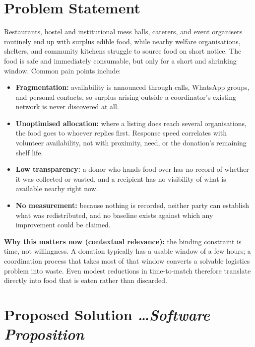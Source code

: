 \documentclass[11pt,a4paper]{article}
\newcommand{\BvrHint}[1]{%
  {\normalfont\normalsize\itshape\hfill #1}}
\begin{document}
\section{Problem Statement}
Restaurants, hostel and institutional mess halls, caterers, and event
organisers routinely end up with surplus edible food, while nearby
welfare organisations, shelters, and community kitchens struggle to
source food on short notice. The food is safe and immediately
consumable, but only for a short and shrinking window. Common pain
points include:
\begin{itemize}[leftmargin=0.7cm]
    \item \textbf{Fragmentation:} availability is announced through calls, WhatsApp groups, and personal contacts, so surplus arising outside a coordinator's existing network is never discovered at all.
    \item \textbf{Unoptimised allocation:} where a listing does reach several organisations, the food goes to whoever replies first. Response speed correlates with volunteer availability, not with proximity, need, or the donation's remaining shelf life.
    \item \textbf{Low transparency:} a donor who hands food over has no record of whether it was collected or wasted, and a recipient has no visibility of what is available nearby right now.
    \item \textbf{No measurement:} because nothing is recorded, neither party can establish what was redistributed, and no baseline exists against which any improvement could be claimed.
\end{itemize}

\textbf{Why this matters now (contextual relevance):} the binding constraint is time, not willingness. A donation typically has a usable window of a few hours; a coordination process that takes most of that window converts a solvable logistics problem into waste. Even modest reductions in time-to-match therefore translate directly into food that is eaten rather than discarded.

\section{Proposed Solution %
\BvrHint{\ldots Software Proposition}}
\end{document}
